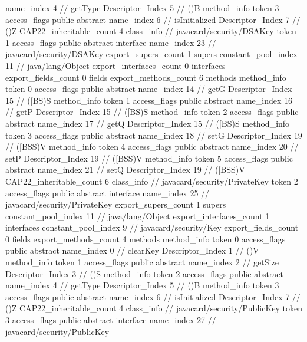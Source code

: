 {{{{{					name_index	4		// getType
					Descriptor_Index	5		// ()B
				}
				method_info {
					token	3
					access_flags	public abstract
					name_index	6		// isInitialized
					Descriptor_Index	7		// ()Z
				}
			}
			CAP22_inheritable_count	4
		}
		class_info {		// javacard/security/DSAKey
			token	1
			access_flags	public abstract interface
			name_index	23		// javacard/security/DSAKey
			export_supers_count	1
			supers {
				constant_pool_index	11		// java/lang/Object
			}
			export_interfaces_count	0
			interfaces {
			}
			export_fields_count	0
			fields {
			}
			export_methods_count	6
			methods {
				method_info {
					token	0
					access_flags	public abstract
					name_index	14		// getG
					Descriptor_Index	15		// ([BS)S
				}
				method_info {
					token	1
					access_flags	public abstract
					name_index	16		// getP
					Descriptor_Index	15		// ([BS)S
				}
				method_info {
					token	2
					access_flags	public abstract
					name_index	17		// getQ
					Descriptor_Index	15		// ([BS)S
				}
				method_info {
					token	3
					access_flags	public abstract
					name_index	18		// setG
					Descriptor_Index	19		// ([BSS)V
				}
				method_info {
					token	4
					access_flags	public abstract
					name_index	20		// setP
					Descriptor_Index	19		// ([BSS)V
				}
				method_info {
					token	5
					access_flags	public abstract
					name_index	21		// setQ
					Descriptor_Index	19		// ([BSS)V
				}
			}
			CAP22_inheritable_count	6
		}
		class_info {		// javacard/security/PrivateKey
			token	2
			access_flags	public abstract interface
			name_index	25		// javacard/security/PrivateKey
			export_supers_count	1
			supers {
				constant_pool_index	11		// java/lang/Object
			}
			export_interfaces_count	1
			interfaces {
				constant_pool_index	9		// javacard/security/Key
			}
			export_fields_count	0
			fields {
			}
			export_methods_count	4
			methods {
				method_info {
					token	0
					access_flags	public abstract
					name_index	0		// clearKey
					Descriptor_Index	1		// ()V
				}
				method_info {
					token	1
					access_flags	public abstract
					name_index	2		// getSize
					Descriptor_Index	3		// ()S
				}
				method_info {
					token	2
					access_flags	public abstract
					name_index	4		// getType
					Descriptor_Index	5		// ()B
				}
				method_info {
					token	3
					access_flags	public abstract
					name_index	6		// isInitialized
					Descriptor_Index	7		// ()Z
				}
			}
			CAP22_inheritable_count	4
		}
		class_info {		// javacard/security/PublicKey
			token	3
			access_flags	public abstract interface
			name_index	27		// javacard/security/PublicKey
}}}
